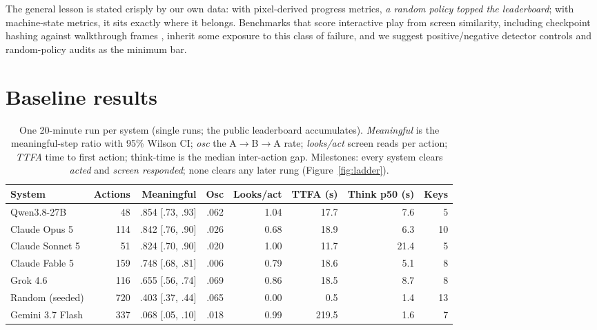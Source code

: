 \documentclass{article} %
\begin{document}
The general lesson is stated crisply by our own data: with pixel-derived
progress metrics, \emph{a random policy topped the leaderboard}; with
machine-state metrics, it sits exactly where it belongs. Benchmarks that
score interactive play from screen similarity, including checkpoint
hashing against walkthrough frames \citep{zhang2025videogamebench},
inherit some
exposure to this class of failure, and we suggest positive/negative detector
controls and random-policy audits \citep[cf.][]{arc2026arcagi3,
hafner2021benchmarking} as the minimum bar.

\section{Baseline results}
\label{sec:results}

\begin{table}[t]
\centering
\caption{One 20-minute run per system (single runs; the public
leaderboard accumulates). \emph{Meaningful} is the meaningful-step ratio
with 95\% Wilson CI; \emph{osc} the A$\to$B$\to$A rate; \emph{looks/act}
screen reads per action; \emph{TTFA} time to first action; think-time is
the median inter-action gap. Milestones: every system clears \emph{acted}
and \emph{screen responded}; none clears any later rung
(Figure~\ref{fig:ladder}).}
\label{tab:results}
\small
\setlength{\tabcolsep}{4.5pt}
\begin{tabular}{@{}lrrrrrrr@{}}
\toprule
System & Actions & Meaningful & Osc & Looks/act & TTFA (s) & Think
p50 (s) & Keys \\
\midrule
Qwen3.8-27B      &  48 & .854 [.73, .93] & .062 & 1.04 &  17.7 &  7.6 &  5 \\
Claude Opus 5    & 114 & .842 [.76, .90] & .026 & 0.68 &  18.9 &  6.3 & 10 \\
Claude Sonnet 5  &  51 & .824 [.70, .90] & .020 & 1.00 &  11.7 & 21.4 &  5 \\
Claude Fable 5   & 159 & .748 [.68, .81] & .006 & 0.79 &  18.6 &  5.1 &  8 \\
Grok 4.6         & 116 & .655 [.56, .74] & .069 & 0.86 &  18.5 &  8.7 &  8 \\
\midrule
Random (seeded)  & 720 & .403 [.37, .44] & .065 & 0.00 &   0.5 &  1.4 & 13 \\
\midrule
Gemini 3.7 Flash & 337 & .068 [.05, .10] & .018 & 0.99 & 219.5 &  1.6 &  7 \\
\bottomrule
\end{tabular}
\end{table}
\end{document}

